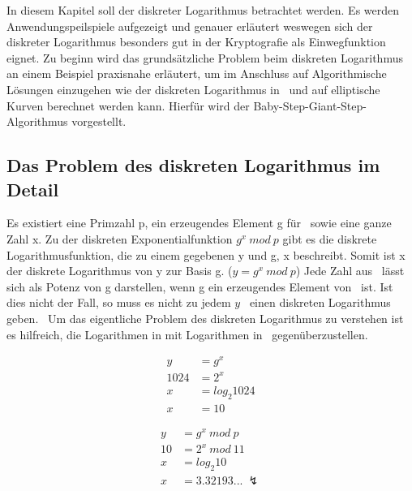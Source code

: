 		In diesem Kapitel soll der diskreter Logarithmus betrachtet werden. Es werden Anwendungspeilspiele aufgezeigt und genauer erläutert weswegen sich der diskreter Logarithmus besonders gut in der Kryptografie als Einwegfunktion eignet. Zu beginn wird das grundsätzliche Problem beim diskreten Logarithmus an einem Beispiel praxisnahe erläutert, um im Anschluss auf Algorithmische Lösungen einzugehen wie der diskreten Logarithmus in \myZPStern~und auf elliptische Kurven berechnet werden kann. Hierfür wird der Baby-Step-Giant-Step-Algorithmus vorgestellt.
	
	\subsection*{Das Problem des diskreten Logarithmus im Detail}\label{Das Problem des diskreten Logarithmus im Detail}
		Es existiert eine Primzahl p, ein erzeugendes Element g für \myZPStern~sowie eine ganze Zahl x. Zu der diskreten Exponentialfunktion $g^x~mod~p$ gibt es die diskrete Logarithmusfunktion, die zu einem gegebenen y und g, x beschreibt. Somit ist x der diskrete Logarithmus von y zur Basis g. ($y = g^x~mod~p$) Jede Zahl aus \myZPStern~lässt sich als Potenz von g darstellen, wenn g ein erzeugendes Element von \myZPStern~ist. Ist dies nicht der Fall, so muss es nicht zu jedem $y$ \myin \myZPStern~einen diskreten Logarithmus geben.~\cite{Kryptografie:in:Theorie:und:Praxis} Um das eigentliche Problem des diskreten Logarithmus zu verstehen ist es hilfreich, die Logarithmen in  mit Logarithmen in \myZPStern~gegenüberzustellen.
		\begin{minipage}{0.24\textwidth}
			\begin{equation}
				\begin{aligned}
					y &= g^x\\
					1024 &= 2^x\\
					x &= log_2 1024\\
					x &= 10
				\end{aligned}
				\label{Gleichung Log in Z}
			\end{equation}
		\end{minipage}
		\begin{minipage}{0.24\textwidth}
			\begin{equation}
				\begin{aligned}
					y &= g^x~mod~p\\
					10 &= 2^x~mod~11\\
					x &= log_2 10\\
					x &= 3.32193...~\lightning
				\end{aligned}
				\label{Gleichung Log in ZP}
			\end{equation}
		\end{minipage}
		
